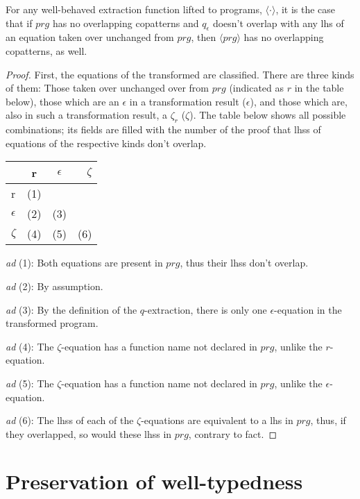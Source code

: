 \begin{proposition}
For any well-behaved extraction function lifted to programs, $\langle \cdot \rangle$, it is the case that if $prg$ has no overlapping copatterns and $q_\epsilon$ doesn't overlap with any lhs of an equation taken over unchanged from $prg$, then $\langle prg \rangle$ has no overlapping copatterns, as well.

\begin{proof}
First, the equations of the transformed are classified. There are three kinds of them: Those taken over unchanged over from $prg$ (indicated as $r$ in the table below), those which are an $\epsilon$ in a transformation result ($\epsilon$), and those which are, also in such a transformation result, a $\zeta_r$ ($\zeta$). The table below shows all possible combinations; its fields are filled with the number of the proof that lhss of equations of the respective kinds don't overlap.

\begin{tabular}{ l | c | c | r }  & r & $\epsilon$ & $\zeta$ \\ \hline r & (1) &  &  \\ \hline $\epsilon$ & (2) & (3) &  \\ \hline $\zeta$ & (4) & (5) & (6) \\ \hline \end{tabular}

\textit{ad} (1): Both equations are present in $prg$, thus their lhss don't overlap.

\textit{ad} (2): By assumption.

\textit{ad} (3): By the definition of the $q$-extraction, there is only one $\epsilon$-equation in the transformed program.

\textit{ad} (4): The $\zeta$-equation has a function name not declared in $prg$, unlike the $r$-equation.

\textit{ad} (5): The $\zeta$-equation has a function name not declared in $prg$, unlike the $\epsilon$-equation.

\textit{ad} (6): The lhss of each of the $\zeta$-equations are equivalent to a lhs in $prg$, thus, if they overlapped, so would these lhss in $prg$, contrary to fact.
\end{proof}
\end{proposition}

\section{Preservation of well-typedness}
\label{sec:extrpwt}

